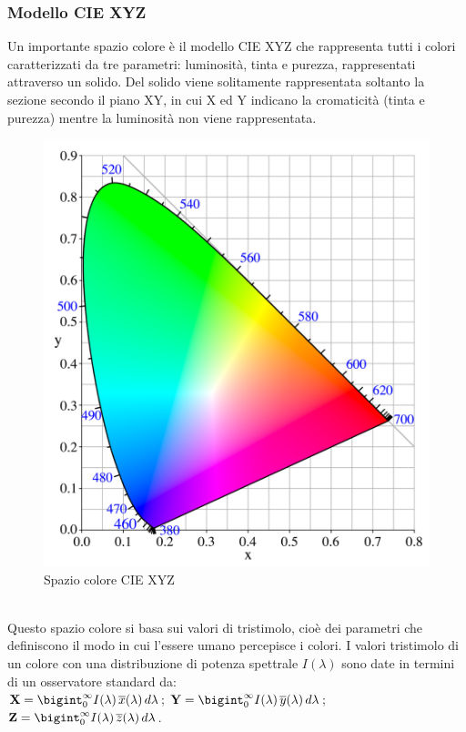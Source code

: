 \documentclass[a4paper,11pt]{article}
\begin{document}
        \subsubsection{Modello CIE XYZ}
        Un importante spazio colore è il modello CIE XYZ che rappresenta tutti i colori caratterizzati da tre parametri: luminosità, tinta e purezza, rappresentati attraverso un solido. 
        Del solido viene solitamente rappresentata soltanto la sezione secondo il piano XY, in cui X ed Y indicano la cromaticità (tinta e purezza) mentre la luminosità non viene rappresentata.
        \begin{figure}[h]
            \centering
            \includegraphics[scale=0.2]{CIEXYZ.png}
            \caption{Spazio colore CIE XYZ}
        \end{figure}
        \\Questo spazio colore si basa sui valori di tristimolo, cioè dei parametri che definiscono il modo in cui l'essere umano percepisce i colori. 
        I valori tristimolo di un colore con una distribuzione di potenza spettrale $I(\lambda)$  sono date in termini di un osservatore standard da:
        \\[0.2in]
            $\textbf{X}=\bigint_0^\infty I(\lambda)\,\overline{x}(\lambda)\,d\lambda$;
            $\textbf{Y}=\bigint_0^\infty I(\lambda)\,\overline{y}(\lambda)\,d\lambda$;
            $\textbf{Z}=\bigint_0^\infty I(\lambda)\,\overline{z}(\lambda)\,d\lambda$.
      
\end{document}
